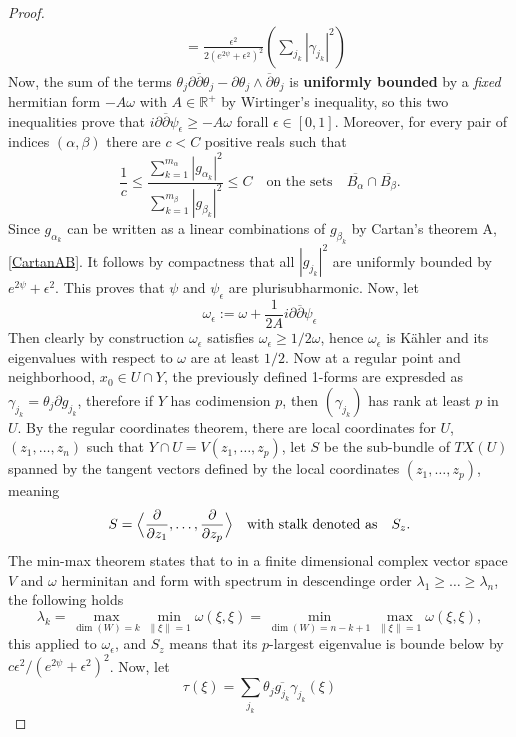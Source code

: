 \documentclass[12pt,twoside,a4paper]{report}
\newcommand{\re}{\ensuremath{\mathbb R }}
\begin{document}
\begin{proof}
\begin{align*}
    &=\frac{\epsilon^2}{2(e^{2\psi}+\epsilon^2)^2}\left(\sum_{j_k}|\gamma_{j_k}|^2\right)
  \end{align*}
  Now, the sum of the terms $\theta_j\partial\overline{\partial}\theta_j-\partial\theta_j\wedge\overline{\partial}\theta_j$ is \textbf{uniformly bounded} by a \emph{fixed} hermitian form $-A\omega$ with $A\in\re^{+}$ by Wirtinger's inequality, so this two inequalities prove that $i\partial\overline{\partial}\psi_{\epsilon}\geq -A\omega$ forall $\epsilon\in[0,1]$. Moreover, for every pair of indices $(\alpha,\beta)$ there are $c<C$ positive reals such that
  \[
    \frac{1}{c}\leq\frac{\sum^{m_\alpha}_{k=1}|g_{\alpha_k}|^2}{\sum^{m_\beta}_{k=1}|g_{\beta_k}|^2}\leq C\quad \text{on the sets}\quad\overline{B_{\alpha}}\cap \overline{B_{\beta}}.
  \]
  Since $g_{\alpha_k}$ can be written as a linear combinations of $g_{\beta_k}$ by Cartan's theorem A, \ref{CartanAB}. It follows by compactness that  all $|g_{j_k}|^2$ are  uniformly bounded by $e^{2\psi}+\epsilon^2$. This proves that $\psi$ and $\psi_\epsilon$ are plurisubharmonic.
  Now, let
  \[
    \omega_{\epsilon}:=\omega + \frac{1}{2A}i\partial\overline{\partial}\psi_{\epsilon}
  \]
  Then clearly by construction $\omega_{\epsilon}$ satisfies $\omega_{\epsilon}\geq 1/2\omega$, hence $\omega_{\epsilon}$ is Kähler and  its eigenvalues with respect to $\omega$ are at least $1/2$.
  Now at a regular point and neighborhood, $x_0\in U\cap Y$, the previously defined 1-forms are expresded as $\gamma_{j_k}=\theta_j\partial g_{j_k}$, therefore if $Y$ has codimension $p$, then $(\gamma_{j_k})$ has rank at least $p$ in $U$. By the regular coordinates theorem, there are local coordinates for $U$, $(z_1,\dots,z_n)$ such that $Y\cap U=V(z_1,\dots,z_p)$, let $S$ be the sub-bundle of $TX(U)$ spanned by the tangent vectors defined by the local coordinates $(z_1,\dots,z_p)$, meaning
  \[
    S=\Bigl\langle\dfrac{\partial}{\partial z_1},\dots,\dfrac{\partial}{\partial z_p}\Bigr\rangle\quad\text{with stalk denoted as}\quad S_z.
  \]
  The min-max theorem states that to in a finite dimensional complex vector space $V$ and $\omega$ herminitan and form with spectrum in descendinge order $\lambda_1\geq\dots\geq\lambda_n$, the following holds
  \[
    \lambda_k=\max_{\dim(W)=k}\min_{\|\xi\|=1}\omega(\xi,\xi)=\min_{\dim(W)=n-k+1}\max_{\|\xi\|=1}\omega(\xi,\xi),
  \]
  this applied to $\omega_{\epsilon}$, and $S_z$ means that its $p$-largest eigenvalue is bounde below by $c\epsilon^2/(e^{2\psi}+\epsilon^2)^2$. Now, let
  \[
    \tau(\xi)=\sum_{j_k}\theta_j\overline{g_{j_k}}\gamma_{j_k}(\xi)
\]
\end{proof}
\end{document}
